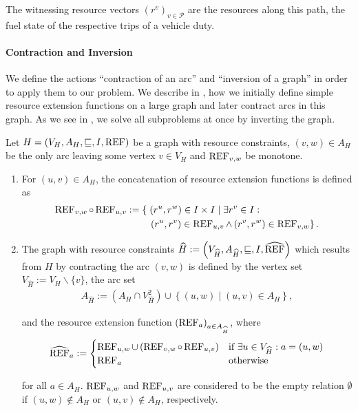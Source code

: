 The witnessing resource vectors $\left(r^v\right)_{v\in\mathcal{P}}$ are the resources along this path, \eg the fuel state of the respective trips of a vehicle duty.

\paragraph{Contraction and Inversion} \parfill

We define the actions \enquote{contraction of an arc} and \enquote{inversion of a graph} in order to apply them to our problem. We describe in , how we initially define simple resource extension functions on a large graph and later contract arcs in this graph. As we see in , we solve all subproblems at once by inverting the graph.

\begin{definition}[Contraction]
\label{def:contraction}

Let ${H=\left(V_H,A_H,\sqsubseteq,I,\operatorname{REF}\right)}$ be a graph with resource constraints, ${(v,w)\in A_H}$ be the only arc leaving some vertex $v\in V_H$ and $\operatorname{REF}_{v,w}$ be monotone.
\begin{enumerate}
	\item
For $(u,v)\in A_H$, the concatenation of resource extension functions is defined as
\begin{align*}
	\REF_{v,w}\circ\REF_{u,v} := \left\{\vphantom{\REF_{v,w}}\right. & \left(r^u,r^w\right)\in I\times I\mid \exists r^v\in I: \\
	& \left.\left(r^u,r^v\right)\in\REF_{u,v}\land\left(r^v,r^w\right)\in\REF_{v,w}\right\}.
\end{align*}
	\item
The graph with resource constraints ${\widehat{H} := \left(V_{\widehat{H}},A_{\widehat{H}},\sqsubseteq,I,\widehat{\operatorname{REF}}\right)}$ which results from $H$ by contracting the arc $(v,w)$ is defined by the vertex set ${V_{\widehat{H}} := V_H\backslash\{v\}}$, the arc set
\begin{align*}
	A_{\widehat{H}} := \left(A_H\cap V^2_{\widehat{H}}\right) \cup \left\{(u,w)\mid (u,v)\in A_H\right\},
\end{align*}

and the resource extension function ${\left(\operatorname{REF}_a\right)_{a\in A_{\widehat{H}}}}$, where
\begin{align*}
	\widehat{\operatorname{REF}}_a :=
	\begin{cases}
		\operatorname{REF}_{u,w}\cup\left(\operatorname{REF}_{v,w}\circ\operatorname{REF}_{u,v}\right) & \text{if } \exists u\in V_{\widehat{H}}: a=(u,w) \\
		\operatorname{REF}_a & \text{otherwise}
	\end{cases}
\end{align*}

for all ${a\in A_H}$. $\operatorname{REF}_{u,w}$ and $\operatorname{REF}_{u,v}$ are considered to be the empty relation $\emptyset$ if ${(u,w)\notin A_H}$ or ${(u,v)\notin A_H}$, respectively.

\end{enumerate}

\end{definition}

